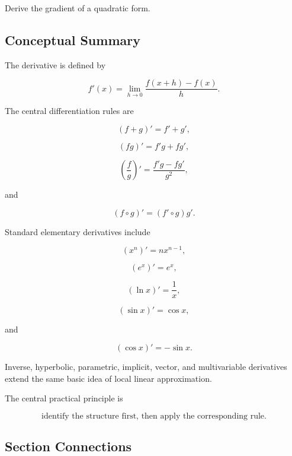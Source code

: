 \begin{exercise}[4]
Derive the gradient of a quadratic form.
\end{exercise}

\subsection{Conceptual Summary}
\label{subsec:derivative-tables-summary}

The derivative is defined by

\[
\boxed{
f'(x)
=
\lim_{h\to0}
\frac{
f(x+h)-f(x)
}{
h
}.
}
\]

The central differentiation rules are

\[
\boxed{
(f+g)'=f'+g',
}
\]

\[
\boxed{
(fg)'=f'g+fg',
}
\]

\[
\boxed{
\left(
\frac fg
\right)'
=
\frac{
f'g-fg'
}{
g^2
},
}
\]

and

\[
\boxed{
(f\circ g)'
=
(f'\circ g)g'.
}
\]

Standard elementary derivatives include

\[
\boxed{
(x^n)'=nx^{n-1},
}
\]

\[
\boxed{
(e^x)'=e^x,
}
\]

\[
\boxed{
(\ln x)'=\frac1x,
}
\]

\[
\boxed{
(\sin x)'=\cos x,
}
\]

and

\[
\boxed{
(\cos x)'=-\sin x.
}
\]

Inverse, hyperbolic, parametric, implicit, vector, and multivariable
derivatives extend the same basic idea of local linear approximation.

The central practical principle is

\[
\boxed{
\text{identify the structure first, then apply the corresponding rule}.
}
\]

\subsection{Section Connections}
\label{subsec:derivative-tables-connections}

